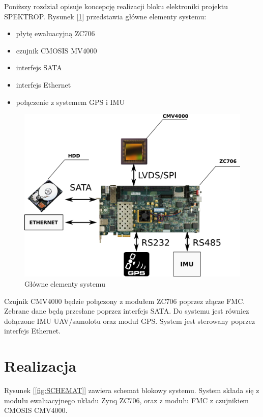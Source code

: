 \documentclass[a4paper,11pt,oneside]{article}  %
\begin{document}
Poniższy rozdział opisuje koncepcję realizacji bloku elektroniki projektu SPEKTROP. Rysunek [\ref{fig:OVER}] przedstawia główne elementy systemu: 
\begin{itemize}
	\item płytę ewaluacyjną ZC706
	\item czujnik CMOSIS MV4000
	\item interfejs SATA
	\item interfejs Ethernet
	\item połączenie z systemem GPS i IMU
\end{itemize}
\begin{figure}[!h]
	\centering
	\includegraphics[width=12cm]{OVER2.png}
	\caption{Główne elementy systemu}
	\label{fig:OVER}
\end{figure}



Czujnik CMV4000 będzie połączony z modułem ZC706 poprzez złącze FMC. Zebrane dane będą przesłane poprzez interfejs SATA. Do systemu jest równiez dołączone IMU UAV/samolotu oraz moduł GPS. System jest sterowany poprzez interfejs Ethernet. 


\section{Realizacja}
Rysunek [\ref{fig:SCHEMAT}] zawiera schemat blokowy systemu. System składa się z modułu ewaluacyjnego układu Zynq ZC706, oraz z modułu FMC z czujnikiem CMOSIS CMV4000.
\end{document}
